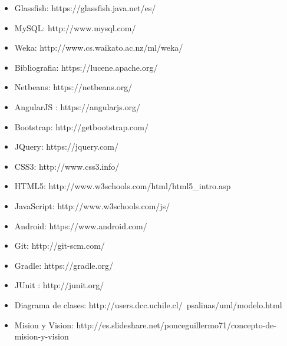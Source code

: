 \documentclass{memoria}
\begin{document}

\begin{itemize}
	\item Glassfish: https://glassfish.java.net/es/
	\item MySQL: http://www.mysql.com/
	\item Weka: http://www.cs.waikato.ac.nz/ml/weka/
	\item Bibliografia: https://lucene.apache.org/
	\item Netbeans: https://netbeans.org/
	\item AngularJS : https://angularjs.org/
	\item Bootstrap: http://getbootstrap.com/
	\item JQuery: https://jquery.com/
	\item CSS3: http://www.css3.info/
	\item HTML5: http://www.w3schools.com/html/html5\_intro.asp
	\item JavaScript: http://www.w3schools.com/js/
	\item Android: https://www.android.com/
	\item Git: http://git-scm.com/
	\item Gradle: https://gradle.org/
	\item JUnit : http://junit.org/
	\item Diagrama de clases: http://users.dcc.uchile.cl/~psalinas/uml/modelo.html
	\item Mision y Vision: http://es.slideshare.net/ponceguillermo71/concepto-de-mision-y-vision
\end{itemize}
\end{document}

